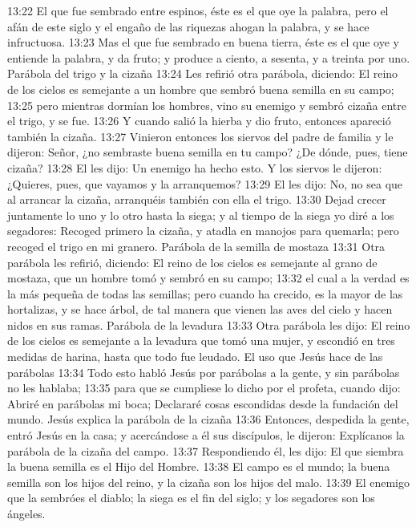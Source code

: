 13:22 El que fue sembrado entre espinos, éste es el que oye la palabra, pero el afán de este siglo y el engaño de las riquezas ahogan la palabra, y se hace infructuosa. 
13:23 Mas el que fue sembrado en buena tierra, éste es el que oye y entiende la palabra, y da fruto; y produce a ciento, a sesenta, y a treinta por uno. 
Parábola del trigo y la cizaña 
13:24 Les refirió otra parábola, diciendo: El reino de los cielos es semejante a un hombre que sembró buena semilla en su campo; 
13:25 pero mientras dormían los hombres, vino su enemigo y sembró cizaña entre el trigo, y se fue. 
13:26 Y cuando salió la hierba y dio fruto, entonces apareció también la cizaña. 
13:27 Vinieron entonces los siervos del padre de familia y le dijeron: Señor, ¿no sembraste buena semilla en tu campo? ¿De dónde, pues, tiene cizaña? 
13:28 El les dijo: Un enemigo ha hecho esto. Y los siervos le dijeron: ¿Quieres, pues, que vayamos y la arranquemos? 
13:29 El les dijo: No, no sea que al arrancar la cizaña, arranquéis también con ella el trigo. 
13:30 Dejad crecer juntamente lo uno y lo otro hasta la siega; y al tiempo de la siega yo diré a los segadores: Recoged primero la cizaña, y atadla en manojos para quemarla; pero recoged el trigo en mi granero. 
Parábola de la semilla de mostaza  
13:31 Otra parábola les refirió, diciendo: El reino de los cielos es semejante al grano de mostaza, que un hombre tomó y sembró en su campo; 
13:32 el cual a la verdad es la más pequeña de todas las semillas; pero cuando ha crecido, es la mayor de las hortalizas, y se hace árbol, de tal manera que vienen las aves del cielo y hacen nidos en sus ramas. 
Parábola de la levadura  
13:33 Otra parábola les dijo: El reino de los cielos es semejante a la levadura que tomó una mujer, y escondió en tres medidas de harina, hasta que todo fue leudado. 
El uso que Jesús hace de las parábolas  
13:34 Todo esto habló Jesús por parábolas a la gente, y sin parábolas no les hablaba; 
13:35 para que se cumpliese lo dicho por el profeta, cuando dijo: 
Abriré en parábolas mi boca; 
Declararé cosas escondidas desde la fundación del mundo. 
Jesús explica la parábola de la cizaña 
13:36 Entonces, despedida la gente, entró Jesús en la casa; y acercándose a él sus discípulos, le dijeron: Explícanos la parábola de la cizaña del campo. 
13:37 Respondiendo él, les dijo: El que siembra la buena semilla es el Hijo del Hombre. 
13:38 El campo es el mundo; la buena semilla son los hijos del reino, y la cizaña son los hijos del malo. 
13:39 El enemigo que la sembróes el diablo; la siega es el fin del siglo; y los segadores son los ángeles. 
